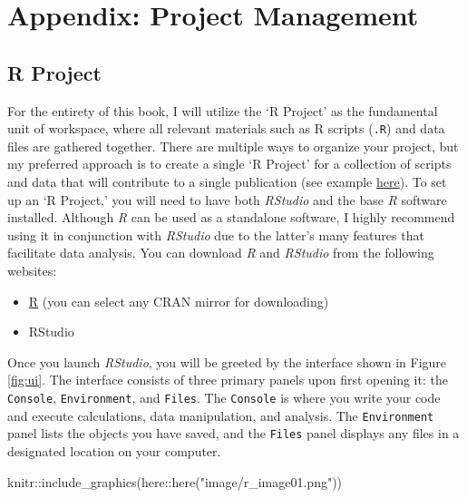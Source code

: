 \documentclass[
]{book}
\newenvironment{Shaded}{\begin{snugshade}}{\end{snugshade}}
\newcommand{\FunctionTok}[1]{\textcolor[rgb]{0.00,0.00,0.00}{#1}}
\newcommand{\NormalTok}[1]{#1}
\newcommand{\SpecialCharTok}[1]{\textcolor[rgb]{0.00,0.00,0.00}{#1}}
\newcommand{\StringTok}[1]{\textcolor[rgb]{0.31,0.60,0.02}{#1}}
\providecommand{\tightlist}{%
  \setlength{\itemsep}{0pt}\setlength{\parskip}{0pt}}
\begin{document}
\hypertarget{appendix-project-management}{%
\chapter{Appendix: Project Management}\label{appendix-project-management}}

\hypertarget{r-project}{%
\section{R Project}\label{r-project}}

For the entirety of this book, I will utilize the `R Project' as the fundamental unit of workspace, where all relevant materials such as R scripts (\texttt{.R}) and data files are gathered together. There are multiple ways to organize your project, but my preferred approach is to create a single `R Project' for a collection of scripts and data that will contribute to a single publication (see example \href{https://github.com/aterui/public-proj_stream-diversity}{here}). To set up an `R Project,' you will need to have both \emph{RStudio} and the base \emph{R} software installed. Although \emph{R} can be used as a standalone software, I highly recommend using it in conjunction with \emph{RStudio} due to the latter's many features that facilitate data analysis. You can download \emph{R} and \emph{RStudio} from the following websites:

\begin{itemize}
\tightlist
\item
  \href{https://www.r-project.org/}{R} (you can select any CRAN mirror for downloading)
\item
  RStudio
\end{itemize}

Once you launch \emph{RStudio}, you will be greeted by the interface shown in Figure \ref{fig:ui}. The interface consists of three primary panels upon first opening it: the \texttt{Console}, \texttt{Environment}, and \texttt{Files}. The \texttt{Console} is where you write your code and execute calculations, data manipulation, and analysis. The \texttt{Environment} panel lists the objects you have saved, and the \texttt{Files} panel displays any files in a designated location on your computer.

\begin{Shaded}
\begin{Highlighting}[]
\NormalTok{knitr}\SpecialCharTok{::}\FunctionTok{include\_graphics}\NormalTok{(here}\SpecialCharTok{::}\FunctionTok{here}\NormalTok{(}\StringTok{"image/r\_image01.png"}\NormalTok{))}
\end{Highlighting}
\end{Shaded}
\end{document}

